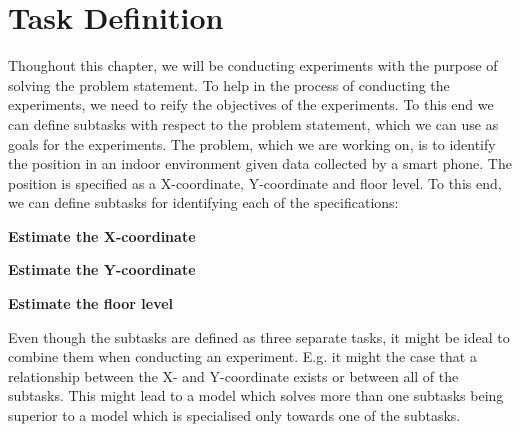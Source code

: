 \section{Task Definition}
Thoughout this chapter, we will be conducting experiments with the purpose of solving the problem statement. To help in the process of conducting the experiments, we need to reify the objectives of the experiments. To this end we can define subtasks with respect to the problem statement, which we can use as goals for the experiments. The problem, which we are working on, is to identify the position in an indoor environment given data collected by a smart phone. The position is specified as a X-coordinate, Y-coordinate and floor level. To this end, we can define subtasks for identifying each of the specifications:
\begin{center}
    \textbf{Estimate the X-coordinate}
\end{center}
\vspace{-0.8cm}
\begin{center}
    \textbf{Estimate the Y-coordinate}
\end{center}
\vspace{-0.8cm}
\begin{center}
    \textbf{Estimate the floor level}
\end{center}
Even though the subtasks are defined as three separate tasks, it might be ideal to combine them when conducting an experiment. E.g. it might the case that a relationship between the X- and Y-coordinate exists or between all of the subtasks. This might lead to a model which solves more than one subtasks being superior to a model which is specialised only towards one of the subtasks. 
